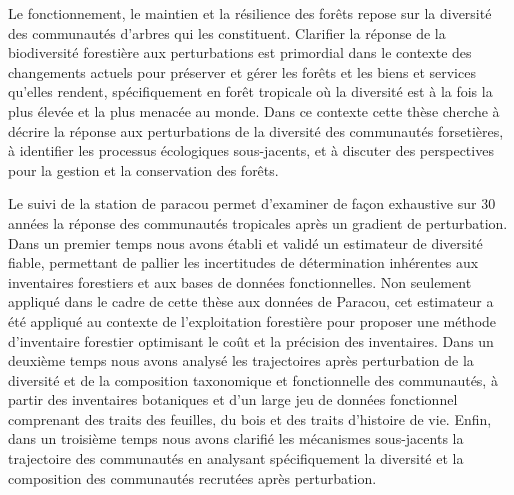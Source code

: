 \documentclass[
  11pt,
  french,
  A4paper,
  extrafontsizes,onecolumn,openright
  ]{memoir}
\begin{document}

\backmatter
\SmallMargins

%
\printbibliography










\evenpage
\SmallMargins
\thispagestyle{empty}

\begin{normalsize}

\begin{description}

\item[Résumé:]
Le fonctionnement, le maintien et la résilience des forêts repose sur la
diversité des communautés d'arbres qui les constituent. Clarifier la
réponse de la biodiversité forestière aux perturbations est primordial
dans le contexte des changements actuels pour préserver et gérer les
forêts et les biens et services qu'elles rendent, spécifiquement en
forêt tropicale où la diversité est à la fois la plus élevée et la plus
menacée au monde. Dans ce contexte cette thèse cherche à décrire la
réponse aux perturbations de la diversité des communautés forsetières, à
identifier les processus écologiques sous-jacents, et à discuter des
perspectives pour la gestion et la conservation des forêts.

Le suivi de la station de paracou permet d'examiner de façon exhaustive
sur 30 années la réponse des communautés tropicales après un gradient de
perturbation. Dans un premier temps nous avons établi et validé un
estimateur de diversité fiable, permettant de pallier les incertitudes
de détermination inhérentes aux inventaires forestiers et aux bases de
données fonctionnelles. Non seulement appliqué dans le cadre de cette
thèse aux données de Paracou, cet estimateur a été appliqué au contexte
de l'exploitation forestière pour proposer une méthode d'inventaire
forestier optimisant le coût et la précision des inventaires. Dans un
deuxième temps nous avons analysé les trajectoires après perturbation de
la diversité et de la composition taxonomique et fonctionnelle des
communautés, à partir des inventaires botaniques et d'un large jeu de
données fonctionnel comprenant des traits des feuilles, du bois et des
traits d'histoire de vie. Enfin, dans un troisième temps nous avons
clarifié les mécanismes sous-jacents la trajectoire des communautés en
analysant spécifiquement la diversité et la composition des communautés
recrutées après perturbation.


\end{description}
\end{normalsize}
\end{document}
